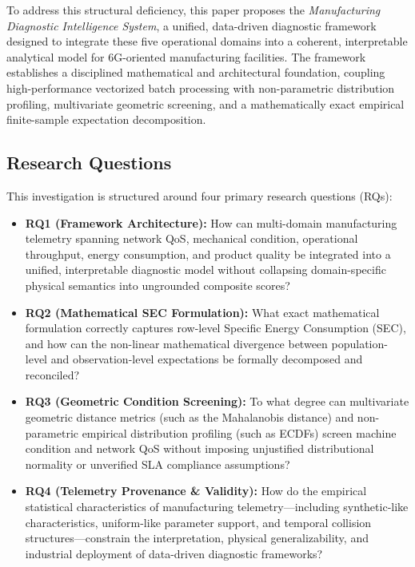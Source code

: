 \documentclass[journal]{IEEEtran}
\begin{document}
To address this structural deficiency, this paper proposes the \textit{Manufacturing Diagnostic Intelligence System}, a unified, data-driven diagnostic framework designed to integrate these five operational domains into a coherent, interpretable analytical model for 6G-oriented manufacturing facilities. The framework establishes a disciplined mathematical and architectural foundation, coupling high-performance vectorized batch processing with non-parametric distribution profiling, multivariate geometric screening, and a mathematically exact empirical finite-sample expectation decomposition.

\subsection{Research Questions}
This investigation is structured around four primary research questions (RQs):
\begin{itemize}
    \item \textbf{RQ1 (Framework Architecture):} How can multi-domain manufacturing telemetry spanning network QoS, mechanical condition, operational throughput, energy consumption, and product quality be integrated into a unified, interpretable diagnostic model without collapsing domain-specific physical semantics into ungrounded composite scores?
    \item \textbf{RQ2 (Mathematical SEC Formulation):} What exact mathematical formulation correctly captures row-level Specific Energy Consumption (SEC), and how can the non-linear mathematical divergence between population-level and observation-level expectations be formally decomposed and reconciled?
    \item \textbf{RQ3 (Geometric Condition Screening):} To what degree can multivariate geometric distance metrics (such as the Mahalanobis distance) and non-parametric empirical distribution profiling (such as ECDFs) screen machine condition and network QoS without imposing unjustified distributional normality or unverified SLA compliance assumptions?
    \item \textbf{RQ4 (Telemetry Provenance \& Validity):} How do the empirical statistical characteristics of manufacturing telemetry---including synthetic-like characteristics, uniform-like parameter support, and temporal collision structures---constrain the interpretation, physical generalizability, and industrial deployment of data-driven diagnostic frameworks?
\end{itemize}
\end{document}
